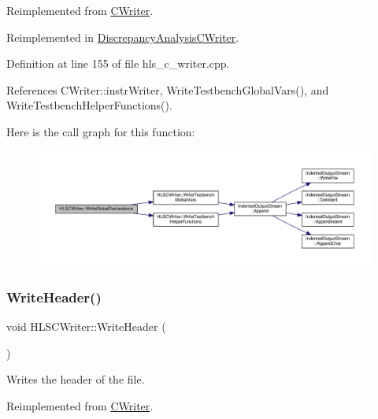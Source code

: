 Reimplemented from \hyperlink{classCWriter_a42b2b558bd1efb2dc637664f5df4df28}{C\+Writer}.



Reimplemented in \hyperlink{classDiscrepancyAnalysisCWriter_a33b017d849ad5c03561e0bd2a72a37a9}{Discrepancy\+Analysis\+C\+Writer}.



Definition at line 155 of file hls\+\_\+c\+\_\+writer.\+cpp.



References C\+Writer\+::instr\+Writer, Write\+Testbench\+Global\+Vars(), and Write\+Testbench\+Helper\+Functions().

Here is the call graph for this function\+:
\nopagebreak
\begin{figure}[H]
\begin{center}
\leavevmode
\includegraphics[width=350pt]{d4/db1/classHLSCWriter_a6ea23b34e9d1bde20adbef400db94c6f_cgraph}
\end{center}
\end{figure}
\mbox{\label{classHLSCWriter_ac7015936ef0ed0f6c31f8d7d4c3bd7fa}} 
\subsubsection{\texorpdfstring{Write\+Header()}{WriteHeader()}}
{\footnotesize\ttfamily void H\+L\+S\+C\+Writer\+::\+Write\+Header (\begin{DoxyParamCaption}{ }\end{DoxyParamCaption})\hspace{0.3cm}{\ttfamily [virtual]}}



Writes the header of the file. 



Reimplemented from \hyperlink{classCWriter_a04b8381e64ef2e49ec7cfc308e10e10a}{C\+Writer}.



